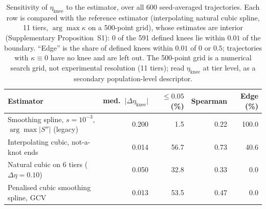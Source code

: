 \begin{table}[t]
\centering
\small
\caption{Sensitivity of $\eta_{\mathrm{knee}}$ to the estimator, over all 600 seed-averaged trajectories. Each row is compared with the reference estimator (interpolating natural cubic spline, 11 tiers, $\arg\max\kappa$ on a 500-point grid), whose estimates are interior (Supplementary Proposition~S1): 0 of the 591 defined knees lie within $0.01$ of the boundary. ``Edge'' is the share of defined knees within $0.01$ of $0$ or $0.5$; trajectories with $\kappa\equiv0$ have no knee and are left out. The 500-point grid is a numerical search grid, not experimental resolution (11 tiers); read $\eta_{\mathrm{knee}}$ at tier level, as a secondary population-level descriptor.}
\label{tab:ablation}
\begin{tabular}{@{}p{4.3cm}rrrr@{}}
\toprule
Estimator & med.\ $\lvert\Delta\eta_{\mathrm{knee}}\rvert$ & $\le 0.05$ (\%) & Spearman & Edge (\%) \\
\midrule
Smoothing spline, $s=10^{-3}$, $\arg\max\lvert S''\rvert$ (legacy) & 0.200 & 1.5 & 0.22 & 100.0 \\
Interpolating cubic, not-a-knot ends & 0.014 & 56.7 & 0.73 & 40.6 \\
Natural cubic on 6 tiers ($\Delta\eta=0.10$) & 0.050 & 32.8 & 0.33 & 0.0 \\
Penalised cubic smoothing spline, GCV & 0.013 & 53.5 & 0.47 & 0.0 \\
\bottomrule
\end{tabular}
\end{table}
